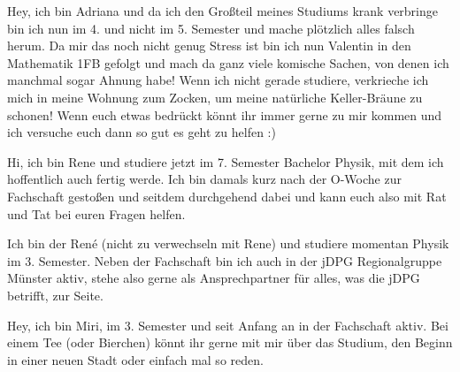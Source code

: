 \begin{multicols*}{2}
{Hey, ich bin Adriana und da ich den Großteil meines Studiums krank verbringe bin ich nun im 4. und nicht im 5. Semester und mache plötzlich alles falsch herum. Da mir das noch nicht genug Stress ist bin ich nun Valentin in den Mathematik 1FB gefolgt und mach da ganz viele komische Sachen, von denen ich manchmal sogar Ahnung habe! Wenn ich nicht gerade studiere, verkrieche ich mich in meine Wohnung zum Zocken, um meine natürliche Keller-Bräune zu schonen! Wenn euch etwas bedrückt könnt ihr immer gerne zu mir kommen und ich versuche euch dann so gut es geht zu helfen :)
\vspace{2\baselineskip}}

{Hi, ich bin Rene und studiere jetzt im 7. Semester Bachelor Physik, mit dem ich hoffentlich auch fertig werde. Ich bin damals kurz nach der O-Woche zur Fachschaft gestoßen und seitdem durchgehend dabei und kann euch also mit Rat und Tat bei euren Fragen helfen. 
\vspace{2\baselineskip}}

{Ich bin der René (nicht zu verwechseln mit Rene) und studiere momentan Physik im 3. Semester. Neben der Fachschaft bin ich auch in der jDPG Regionalgruppe Münster aktiv, stehe also gerne als Ansprechpartner für alles, was die jDPG betrifft, zur Seite.
	\vspace{2\baselineskip}}

{Hey, ich bin Miri, im 3. Semester und seit Anfang an in der Fachschaft aktiv. Bei einem Tee (oder Bierchen) könnt ihr gerne mit mir über das Studium, den Beginn in einer neuen Stadt oder einfach mal so reden.
	\vspace{2\baselineskip}}


\end{multicols*}
